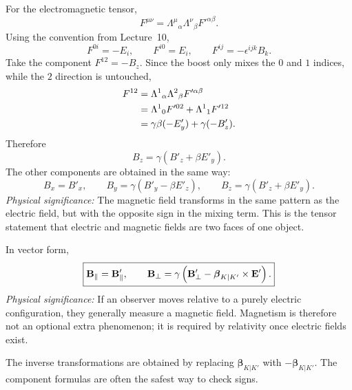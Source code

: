 For the electromagnetic tensor,
\begin{equation}\label{eq:lec11-F-transform}
  F^{\mu\nu}
  =
  \Lambda^\mu{}_{\alpha}\Lambda^\nu{}_{\beta}F'^{\alpha\beta}.
\end{equation}
Using the convention from Lecture~10,
\begin{equation}\label{eq:lec11-F-components}
  F^{0i}=-E_i,\qquad
  F^{i0}=E_i,\qquad
  F^{ij}=-\epsilon^{ijk}B_k .
\end{equation}
Take the component $F^{12}=-B_z$.  Since the boost only mixes the $0$ and $1$
indices, while the $2$ direction is untouched,
\begin{align}
  F^{12}
  &=
  \Lambda^1{}_{\alpha}\Lambda^2{}_{\beta}F'^{\alpha\beta}
  \notag\\
  &=
  \Lambda^1{}_{0}F'^{02}+\Lambda^1{}_{1}F'^{12}
  \notag\\
  &=
  \gamma\beta(-E'_y)+\gamma(-B'_z).
  \label{eq:lec11-F12-work}
\end{align}
Therefore
\begin{equation}\label{eq:lec11-Bz-result}
  B_z=\gamma(B'_z+\beta E'_y).
\end{equation}
The other components are obtained in the same way:
\begin{equation}\label{eq:lec11-B-components}
  \boxed{
  B_x=B'_x,\qquad
  B_y=\gamma(B'_y-\beta E'_z),\qquad
  B_z=\gamma(B'_z+\beta E'_y).
  }
\end{equation}
\textit{Physical significance:} The magnetic field transforms in the same pattern
as the electric field, but with the opposite sign in the mixing term.  This is the
tensor statement that electric and magnetic fields are two faces of one object.

In vector form,
\begin{equation}\label{eq:lec11-B-vector}
  \boxed{
  \mathbf{B}_{\parallel}=\mathbf{B}'_{\parallel},\qquad
  \mathbf{B}_{\perp}
  =
  \gamma\left(\mathbf{B}'_{\perp}
  -\boldsymbol{\beta}_{K|K'}\times\mathbf{E}'\right).
  }
\end{equation}
\textit{Physical significance:} If an observer moves relative to a purely electric
configuration, they generally measure a magnetic field.  Magnetism is therefore
not an optional extra phenomenon; it is required by relativity once electric fields
exist.

The inverse transformations are obtained by replacing $\boldsymbol{\beta}_{K|K'}$
with $-\boldsymbol{\beta}_{K|K'}$.  The component formulas are often the safest
way to check signs.

